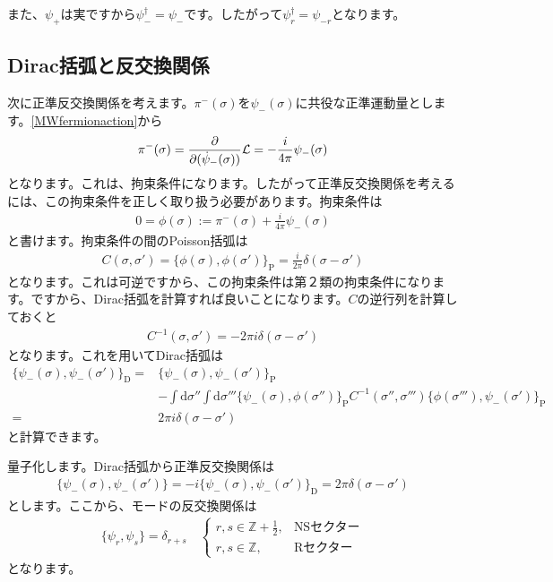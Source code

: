 \documentclass[report,paper=a4, fontsize=12pt, line_length=16cm, number_of_lines=34,dvipdfmx]{jlreq}
\numberwithin{equation}{chapter}
\numberwithin{equation}{section}
\newcommand{\Zb}{\mathbb{Z}}
\newcommand{\Lcal}{\mathcal{L}}
\newcommand{\pbk}[1]{\{#1\}_{\mathrm{P}}}
\newcommand{\dbk}[1]{\{#1\}_{\mathrm{D}}}
\newcommand{\di}{\mathrm{d}}
\begin{document}
また、$\psi_{+}$は実ですから$\psi_{-}^{\dag}=\psi_{-}$です。したがって$\psi_{r}^{\dag}=\psi_{-r}$となります。

\subsection{Dirac括弧と反交換関係}
次に正準反交換関係を考えます。$\pi^{-}(\sigma)$を$\psi_{-}(\sigma)$に共役な正準運動量とします。\eqref{MWfermionaction}から
\begin{align}
  \pi^{-}(\sigma)=\pdv{(\dot{\psi}_{-}(\sigma))}\Lcal=-\frac{i}{4\pi}\psi_{-}(\sigma)
\end{align}
となります。これは、拘束条件になります。したがって正準反交換関係を考えるには、この拘束条件を正しく取り扱う必要があります。拘束条件は
\begin{align}
  0=\phi(\sigma):=\pi^{-}(\sigma)+\frac{i}{4\pi}\psi_{-}(\sigma)
\end{align}
と書けます。拘束条件の間のPoisson括弧は
\begin{align}
  C(\sigma,\sigma')=\pbk{\phi(\sigma),\phi(\sigma')}=\frac{i}{2\pi}\delta(\sigma-\sigma')
\end{align}
となります。これは可逆ですから、この拘束条件は第２類の拘束条件になります。ですから、Dirac括弧を計算すれば良いことになります。$C$の逆行列を計算しておくと
\begin{align}
  C^{-1}(\sigma,\sigma')=-2\pi i\delta(\sigma-\sigma')
\end{align}
となります。これを用いてDirac括弧は
\begin{align}
  \dbk{\psi_{-}(\sigma),\psi_{-}(\sigma')}
  =&\pbk{\psi_{-}(\sigma),\psi_{-}(\sigma')}\nonumber \\
   &-\int \di\sigma''\int \di \sigma'''
   \pbk{\psi_{-}(\sigma),\phi(\sigma'')}C^{-1}(\sigma'',\sigma''')\pbk{\phi(\sigma'''),\psi_{-}(\sigma')}\nonumber\\
   =&2\pi i \delta(\sigma-\sigma')
\end{align}
と計算できます。

量子化します。Dirac括弧から正準反交換関係は
\begin{align}
  \{\psi_{-}(\sigma),\psi_{-}(\sigma')\}
  =-i\dbk{\psi_{-}(\sigma),\psi_{-}(\sigma')}
  =2\pi \delta(\sigma-\sigma')
\end{align}
とします。ここから、モードの反交換関係は
\begin{align}
  \{\psi_{r},\psi_{s}\}=\delta_{r+s}\quad
  \begin{cases}
    r,s\in \Zb+\frac12,&\text{NSセクター}\\
    r,s\in \Zb,&\text{Rセクター}
  \end{cases}
  \label{anticomm}
\end{align}
となります。
\end{document}
